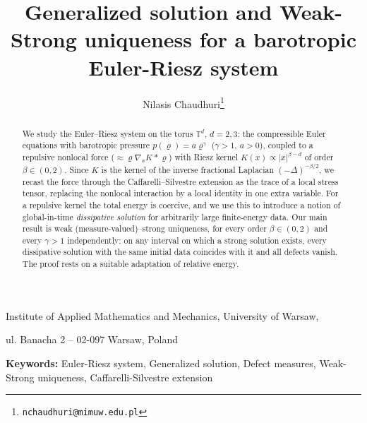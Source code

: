 \documentclass[12pt,a4paper,twoside]{article}
\newcommand{\Grad}{\nabla}
\numberwithin{equation}{section}%
\begin{document}
	
	\title{Generalized solution and Weak-Strong uniqueness for a barotropic Euler-Riesz system}
	
	
	\author{Nilasis Chaudhuri\footnote{\texttt{nchaudhuri@mimuw.edu.pl}}}
	\date{}     
	
	
	\maketitle
	\vspace{-5mm}
	{
		\small
		\centerline{Institute of Applied Mathematics and Mechanics, University of Warsaw,}
		\centerline{ul. Banacha 2 -- 02-097 Warsaw, Poland}
	}

	\begin{abstract}
We study the Euler--Riesz system on the torus $\mathbb T^d$, $d=2,3$: the compressible Euler
equations with barotropic pressure $p(\varrho)=a\varrho^\gamma$ ($\gamma>1$, $a>0$), coupled to a
repulsive nonlocal force ($\approx \varrho \Grad_x K \ast \varrho$) with Riesz kernel
$K(x)\propto|x|^{\beta-d}$ of order $\beta\in(0,2)$. Since $K$ is the kernel of the inverse
fractional Laplacian $(-\Delta)^{-\beta/2}$, we recast the force through the Caffarelli--Silvestre
extension as the trace of a local stress tensor, replacing the nonlocal interaction by a local
identity in one extra variable. For a repulsive kernel the total energy is coercive, and we use
this to introduce a notion of global-in-time \emph{dissipative solution} for arbitrarily large finite-energy
data. Our main result is weak (measure-valued)--strong uniqueness, for every order
$\beta\in(0,2)$ and every $\gamma>1$ independently: on any interval on which a strong solution
exists, every dissipative solution with the same initial data coincides with it and all defects
vanish. The proof rests on a suitable adaptation of relative energy.
	\end{abstract}
	
	
	{\bf Keywords:} Euler-Riesz system, Generalized solution, Defect measures, Weak-Strong uniqueness, Caffarelli-Silvestre extension \\
	
\end{document}
